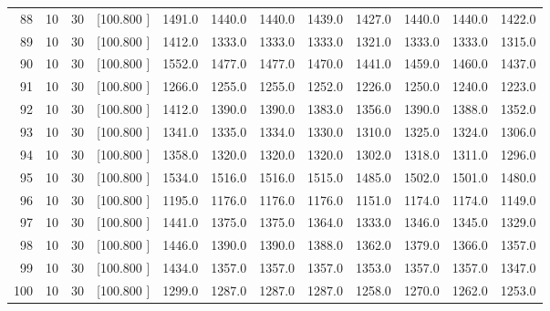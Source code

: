 \documentclass[12pt,a4paper]{article}
\begin{document}
\begin{center}
{\begin{tabular}{r r r r r r r r r r r r}
  88& 10& 30&[100.800   ]&  1491.0&  1440.0&  1440.0&  1439.0&  1427.0&  1440.0&  1440.0&  1422.0\\[-0.02in]
  89& 10& 30&[100.800   ]&  1412.0&  1333.0&  1333.0&  1333.0&  1321.0&  1333.0&  1333.0&  1315.0\\[-0.02in]
  90& 10& 30&[100.800   ]&  1552.0&  1477.0&  1477.0&  1470.0&  1441.0&  1459.0&  1460.0&  1437.0\\[-0.02in]
  91& 10& 30&[100.800   ]&  1266.0&  1255.0&  1255.0&  1252.0&  1226.0&  1250.0&  1240.0&  1223.0\\[-0.02in]
  92& 10& 30&[100.800   ]&  1412.0&  1390.0&  1390.0&  1383.0&  1356.0&  1390.0&  1388.0&  1352.0\\[-0.02in]
  93& 10& 30&[100.800   ]&  1341.0&  1335.0&  1334.0&  1330.0&  1310.0&  1325.0&  1324.0&  1306.0\\[-0.02in]
  94& 10& 30&[100.800   ]&  1358.0&  1320.0&  1320.0&  1320.0&  1302.0&  1318.0&  1311.0&  1296.0\\[-0.02in]
  95& 10& 30&[100.800   ]&  1534.0&  1516.0&  1516.0&  1515.0&  1485.0&  1502.0&  1501.0&  1480.0\\[-0.02in]
  96& 10& 30&[100.800   ]&  1195.0&  1176.0&  1176.0&  1176.0&  1151.0&  1174.0&  1174.0&  1149.0\\[-0.02in]
  97& 10& 30&[100.800   ]&  1441.0&  1375.0&  1375.0&  1364.0&  1333.0&  1346.0&  1345.0&  1329.0\\[-0.02in]
  98& 10& 30&[100.800   ]&  1446.0&  1390.0&  1390.0&  1388.0&  1362.0&  1379.0&  1366.0&  1357.0\\[-0.02in]
  99& 10& 30&[100.800   ]&  1434.0&  1357.0&  1357.0&  1357.0&  1353.0&  1357.0&  1357.0&  1347.0\\[-0.02in]
 100& 10& 30&[100.800   ]&  1299.0&  1287.0&  1287.0&  1287.0&  1258.0&  1270.0&  1262.0&  1253.0\\[-0.02in]

\hline
\end{tabular}}
\end{center}
\newpage
\end{document}
